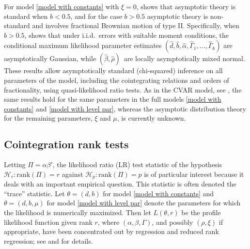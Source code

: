 \documentclass[10pt]{article}
\begin{document}
For model \eqref{model with constants} with $\xi=0$, \cite{johansen2012likelihood} shows that asymptotic theory is standard when $b<0.5$, and for the case $b>0.5$ asymptotic theory is non-standard and involves fractional Brownian motion of type II. Specifically, when $b>0.5$, \cite{johansen2012likelihood} shows that under i.i.d.\ errors with suitable moment conditions, the conditional maximum likelihood parameter estimates  $(\hat{d},\hat{b},\hat{\alpha},\hat{\Gamma}_{1},\ldots,\hat{\Gamma}_{k})$ are asymptotically Gaussian, while $(\hat{\beta},\hat{\rho})$\ are locally asymptotically mixed normal. These results allow asymptotically standard (chi-squared) inference on all parameters of the model, including the cointegrating relations and orders of fractionality, using quasi-likelihood ratio tests. As in the CVAR model, see \cite{Johansen1995}, the same results hold for the same parameters in the full models \eqref{model with constants} and \eqref{model with level par}, whereas the asymptotic distribution theory for the remaining parameters, $\xi$ and $\mu$, is currently unknown.


\subsection{Cointegration rank tests}

Letting $\Pi = \alpha \beta'$, the likelihood ratio (LR) test statistic of the hypothesis $\mathcal{H}_{r}: \mathrm{rank}(\Pi )=r$ against $\mathcal{H}_{p}:\mathrm{rank}(\Pi )=p$ is of particular interest because it deals with an important empirical question. This statistic is often denoted the ``trace'' statistic. Let $\theta = (d,b)$ for model \eqref{model with constants} and $\theta = (d,b,\mu)$ for model \eqref{model with level par} denote the parameters for which the likelihood is numerically maximized. Then let $L(\theta,r)$ be the profile likelihood function given rank $r$, where $(\alpha ,\beta ,\Gamma )$, and possibly $(\rho,\xi)$ if appropriate, have been concentrated out by regression and reduced rank regression; see \cite{johansen2012likelihood} and \cite{Dolatabadi2014} for details.
\end{document}
